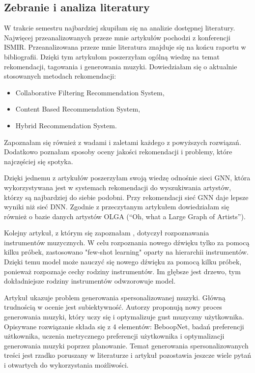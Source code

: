 \documentclass[a4paper,titleauthor]{mwart}
\begin{document}
\subsection{Zebranie i analiza literatury}
W trakcie semestru najbardziej skupiłam się na analizie dostępnej literatury. Najwięcej przeanalizowanych przeze mnie artykułów pochodzi z konferencji ISMIR. Przeanalizowana przeze mnie literatura znajduje się na końcu raportu w bibliografii. Dzięki tym artykułom poszerzyłam ogólną wiedzę na temat rekomendacji, tagowania i generowania muzyki. Dowiedziałam się o aktualnie stosowanych metodach rekomendacji: 
\begin{itemize}
    \item Collaborative Filtering Recommendation System,
    \item Content Based Recommendation System,
    \item Hybrid Recommendation System.
\end{itemize}
Zapoznałam się również z wadami i zaletami każdego z powyższych rozwiązań. Dodatkowo poznałam sposoby oceny jakości rekomendacji i problemy, które najczęściej się spotyka.

Dzięki jednemu z artykułów \cite{korzeniowski2021artist} poszerzyłam swoją wiedzę odnośnie sieci GNN, która wykorzystywana jest w systemach rekomendacji do wyszukiwania artystów, którzy są najbardziej do siebie podobni. Przy rekomendacji sieć GNN daje lepsze wyniki niż sieć DNN. Zgodnie z przeczytanym artykułem dowiedziałam się również o bazie danych artystów OLGA (“Oh, what a Large Graph of Artists”). 

Kolejny artykuł, z którym się zapoznałam \cite{garcia2021leveraging}, dotyczył rozpoznawania instrumentów muzycznych. W celu rozpoznania nowego dźwięku tylko za pomocą kilku próbek, zastosowano "few-shot learning" oparty na hierarchii instrumentów. Dzięki temu model może nauczyć się nowego dźwięku za pomocą kilku próbek, ponieważ rozpoznaje cechy rodziny instrumentów. Im głębsze jest drzewo, tym dokładniejsze rodziny instrumentów odwzorowuje model. 

Artykuł \cite{hakimi2020bebopnet} ukazuje problem generowania spersonalizowanej muzyki. Główną trudnością w ocenie jest subiektywność. Autorzy proponują nowy proces generowania muzyki, który uczy się i optymalizuje gust muzyczny użytkownika. Opisywane rozwiązanie składa się z 4 elementów: BeboopNet, badań preferencji użtkownika, uczenia metrycznego preferencji użytkownika i optymalizacji generowania muzyki poprzez planowanie. Temat generowania spersonalizowanych treści jest rzadko poruszany w literaturze i artykuł pozostawia jeszcze wiele pytań i otwartych do wykorzystania możliwości.
\end{document}
